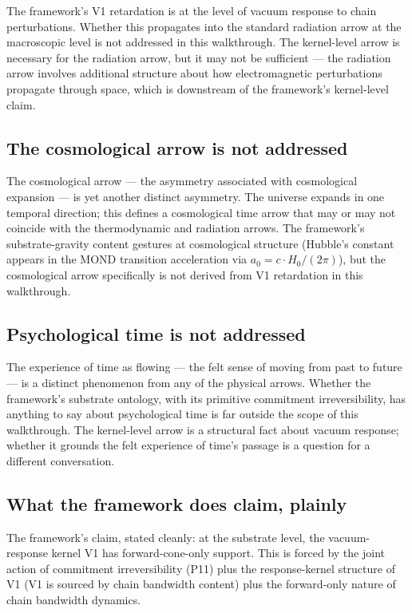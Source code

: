 \documentclass[11pt,a4paper]{article}
\begin{document}
The framework's V1 retardation is at the level of vacuum response to chain perturbations. Whether this propagates into the standard radiation arrow at the macroscopic level is not addressed in this walkthrough. The kernel-level arrow is necessary for the radiation arrow, but it may not be sufficient --- the radiation arrow involves additional structure about how electromagnetic perturbations propagate through space, which is downstream of the framework's kernel-level claim.

\subsection{The cosmological arrow is not addressed}

The cosmological arrow --- the asymmetry associated with cosmological expansion --- is yet another distinct asymmetry. The universe expands in one temporal direction; this defines a cosmological time arrow that may or may not coincide with the thermodynamic and radiation arrows. The framework's substrate-gravity content gestures at cosmological structure (Hubble's constant appears in the MOND transition acceleration via $a_0 = c \cdot H_0/(2\pi)$), but the cosmological arrow specifically is not derived from V1 retardation in this walkthrough.

\subsection{Psychological time is not addressed}

The experience of time as flowing --- the felt sense of moving from past to future --- is a distinct phenomenon from any of the physical arrows. Whether the framework's substrate ontology, with its primitive commitment irreversibility, has anything to say about psychological time is far outside the scope of this walkthrough. The kernel-level arrow is a structural fact about vacuum response; whether it grounds the felt experience of time's passage is a question for a different conversation.

\subsection{What the framework does claim, plainly}

The framework's claim, stated cleanly: at the substrate level, the vacuum-response kernel V1 has forward-cone-only support. This is forced by the joint action of commitment irreversibility (P11) plus the response-kernel structure of V1 (V1 is sourced by chain bandwidth content) plus the forward-only nature of chain bandwidth dynamics.
\end{document}
